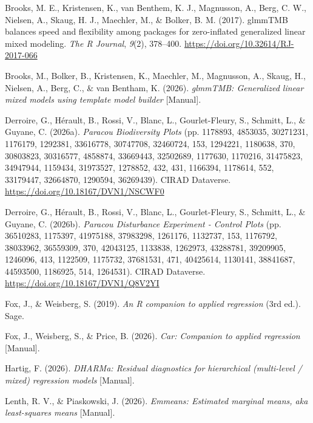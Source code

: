 \documentclass[
  american,
  11pt,
]{stylisharticle}
\newlength{\cslhangindent}
\newenvironment{CSLReferences}[2] %
 {\begin{list}{}{%
  \setlength{\itemindent}{0pt}
  \setlength{\leftmargin}{0pt}
  \setlength{\parsep}{0pt}
  \ifodd #1
   \setlength{\leftmargin}{\cslhangindent}
   \setlength{\itemindent}{-1\cslhangindent}
  \fi
  \setlength{\itemsep}{#2\baselineskip}}}
 {\end{list}}
\begin{document}
\protect{}\label{refs}
\begin{CSLReferences}{1}{0}
{Brooks, M. E., Kristensen, K., van Benthem, K. J., Magnusson, A., Berg,
C. W., Nielsen, A., Skaug, H. J., Maechler, M., \& Bolker, B. M.}
(2017). {glmmTMB} balances speed and flexibility among packages for
zero-inflated generalized linear mixed modeling. \emph{The R Journal},
\emph{9}(2), 378--400. \url{https://doi.org/10.32614/RJ-2017-066}

{Brooks, M., Bolker, B., Kristensen, K., Maechler, M., Magnusson, A.,
Skaug, H., Nielsen, A., Berg, C., \& van Bentham, K.} (2026).
\emph{{glmmTMB}: {Generalized} linear mixed models using template model
builder} {[}Manual{]}.

Derroire, G., Hérault, B., Rossi, V., Blanc, L., Gourlet-Fleury, S.,
Schmitt, L., \& Guyane, C. (2026a). \emph{Paracou {Biodiversity Plots}}
(pp. 1178893, 4853035, 30271231, 1176179, 1292381, 33616778, 30747708,
32460724, 153, 1294221, 1180638, 370, 30803823, 30316577, 4858874,
33669443, 32502689, 1177630, 1170216, 31475823, 34947944, 1159434,
31973527, 1278852, 432, 431, 1166394, 1178614, 552, 33179447, 32664870,
1290594, 36269439). CIRAD Dataverse.
\url{https://doi.org/10.18167/DVN1/NSCWF0}

Derroire, G., Hérault, B., Rossi, V., Blanc, L., Gourlet-Fleury, S.,
Schmitt, L., \& Guyane, C. (2026b). \emph{Paracou {Disturbance
Experiment} - {Control Plots}} (pp. 36510283, 1175397, 41975188,
37983298, 1261176, 1132737, 153, 1176792, 38033962, 36559309, 370,
42043125, 1133838, 1262973, 43288781, 39209905, 1246096, 413, 1122509,
1175732, 37681531, 471, 40425614, 1130141, 38841687, 44593500, 1186925,
514, 1264531). CIRAD Dataverse.
\url{https://doi.org/10.18167/DVN1/Q8V2YI}

Fox, J., \& Weisberg, S. (2019). \emph{An {R} companion to applied
regression} (3rd ed.). Sage.

Fox, J., Weisberg, S., \& Price, B. (2026). \emph{Car: {Companion} to
applied regression} {[}Manual{]}.

Hartig, F. (2026). \emph{{DHARMa}: {Residual} diagnostics for
hierarchical (multi-level / mixed) regression models} {[}Manual{]}.

Lenth, R. V., \& Piaskowski, J. (2026). \emph{Emmeans: {Estimated}
marginal means, aka least-squares means} {[}Manual{]}.


\end{CSLReferences}
\end{document}
